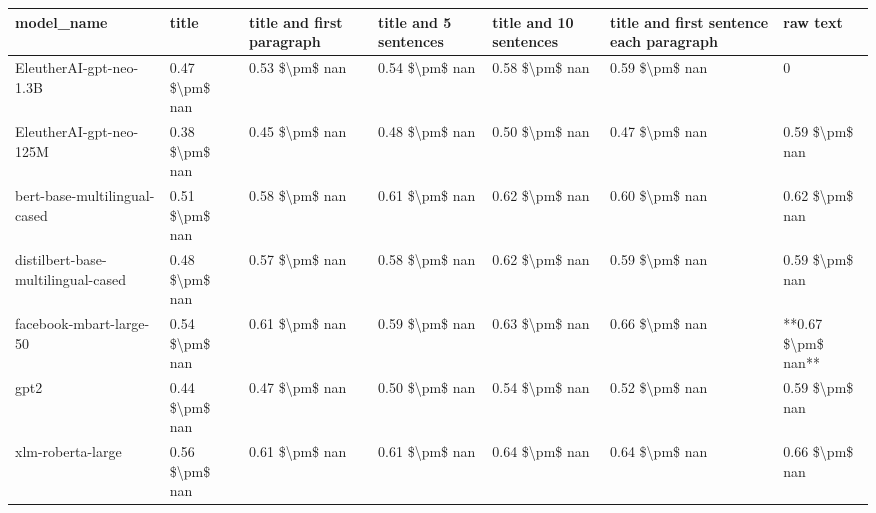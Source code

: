 \begin{tabular}{lllllll}
\toprule
                        model\_name &          title & title and first paragraph & title and 5 sentences & title and 10 sentences & title and first sentence each paragraph &           raw text \\
\midrule
           EleutherAI-gpt-neo-1.3B & 0.47 \$\textbackslash pm\$ nan &            0.53 \$\textbackslash pm\$ nan &        0.54 \$\textbackslash pm\$ nan &         0.58 \$\textbackslash pm\$ nan &                          0.59 \$\textbackslash pm\$ nan &                  0 \\
           EleutherAI-gpt-neo-125M & 0.38 \$\textbackslash pm\$ nan &            0.45 \$\textbackslash pm\$ nan &        0.48 \$\textbackslash pm\$ nan &         0.50 \$\textbackslash pm\$ nan &                          0.47 \$\textbackslash pm\$ nan &     0.59 \$\textbackslash pm\$ nan \\
      bert-base-multilingual-cased & 0.51 \$\textbackslash pm\$ nan &            0.58 \$\textbackslash pm\$ nan &        0.61 \$\textbackslash pm\$ nan &         0.62 \$\textbackslash pm\$ nan &                          0.60 \$\textbackslash pm\$ nan &     0.62 \$\textbackslash pm\$ nan \\
distilbert-base-multilingual-cased & 0.48 \$\textbackslash pm\$ nan &            0.57 \$\textbackslash pm\$ nan &        0.58 \$\textbackslash pm\$ nan &         0.62 \$\textbackslash pm\$ nan &                          0.59 \$\textbackslash pm\$ nan &     0.59 \$\textbackslash pm\$ nan \\
           facebook-mbart-large-50 & 0.54 \$\textbackslash pm\$ nan &            0.61 \$\textbackslash pm\$ nan &        0.59 \$\textbackslash pm\$ nan &         0.63 \$\textbackslash pm\$ nan &                          0.66 \$\textbackslash pm\$ nan & **0.67 \$\textbackslash pm\$ nan** \\
                              gpt2 & 0.44 \$\textbackslash pm\$ nan &            0.47 \$\textbackslash pm\$ nan &        0.50 \$\textbackslash pm\$ nan &         0.54 \$\textbackslash pm\$ nan &                          0.52 \$\textbackslash pm\$ nan &     0.59 \$\textbackslash pm\$ nan \\
                 xlm-roberta-large & 0.56 \$\textbackslash pm\$ nan &            0.61 \$\textbackslash pm\$ nan &        0.61 \$\textbackslash pm\$ nan &         0.64 \$\textbackslash pm\$ nan &                          0.64 \$\textbackslash pm\$ nan &     0.66 \$\textbackslash pm\$ nan \\
\bottomrule
\end{tabular}
